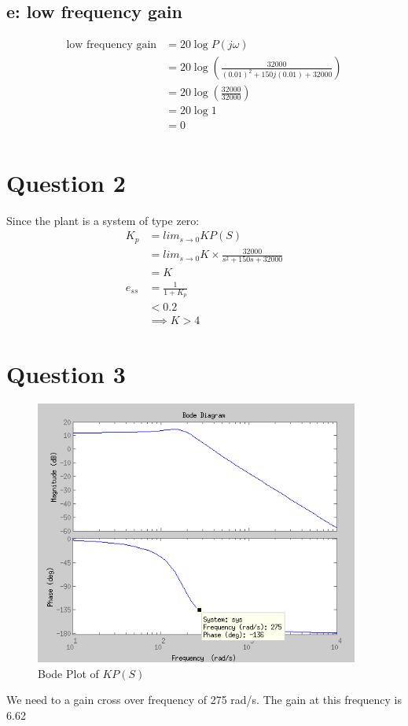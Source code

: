 \documentclass{article}
\begin{document}
\subsection{e: low frequency gain} %
\label{sub:e_low_frequency_gain}
\begin{align*}
\text{low frequency gain} &= 20\log P(j\omega)\\
    &= 20\log (\frac{32000}{(0.01)^2 + 150j(0.01) + 32000})\\
    &= 20\log (\frac{32000}{32000})\\
    &= 20\log 1\\
    &= 0\\
\end{align*}


\section{Question 2} %
\label{sec:question_2}
Since the plant is a system of type zero:
\begin{align*}
K_p &= lim_{s \to 0} KP(S)\\
    &= lim_{s \to 0} K\times \frac{32000}{s^2 + 150s + 32000}\\
    &= K\\
e_{ss} &= \frac{1}{1+K_p}\\
        &< 0.2\\
        &\implies K > 4
\end{align*}


\section{Question 3} %
\label{sec:question_3}
\begin{figure}[!htbp]
    \centering
    \includegraphics[width=0.95\textwidth]{prop_sys2.png}
    \caption{Bode Plot of $KP(S)$}
\end{figure}
We need to a gain cross over frequency of 275 rad/s. The gain at this frequency is 6.62
\end{document}
